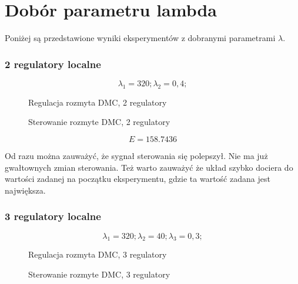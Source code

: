 \chapter{Dobór parametru lambda}

Poniżej są przedstawione wyniki eksperymentów z dobranymi parametrami $\lambda$.

\subsection{2 regulatory localne}

\begin{equation}
{\lambda}_1 = 320; {\lambda}_2 = 0,4;
\end{equation}

\begin{figure}[H]
\centering

\caption{Regulacja rozmyta DMC, 2 regulatory}
\end{figure}

\begin{figure}[H]
\centering

\caption{Sterowanie rozmyte DMC, 2 regulatory}
\end{figure}

\begin{equation}
    E = \num{158,7436}
\end{equation}

Od razu można zauważyć, że sygnał sterowania się polepszył. Nie ma już gwałtownych zmian sterowania.  Też warto zauważyć że układ szybko dociera do wartości zadanej na początku eksperymentu, gdzie ta wartość zadana jest największa.

\subsection{3 regulatory localne}

\begin{equation}
{\lambda}_1 = 320; {\lambda}_2 = 40; {\lambda}_3 = 0,3;
\end{equation}

\begin{figure}[H]
\centering

\caption{Regulacja rozmyta DMC, 3 regulatory}
\end{figure}

\begin{figure}[H]
\centering

\caption{Sterowanie rozmyte DMC, 3 regulatory}
\end{figure}


